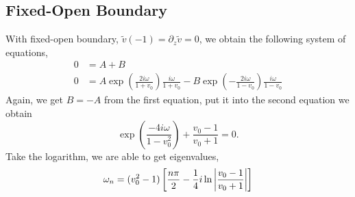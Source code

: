 \subsection*{Fixed-Open Boundary}
With fixed-open boundary, $\tilde{v}(-1)=\partial_z\tilde{v}=0$, we obtain the following system of equations,
\begin{align*}
	0 & = A + B                                                                                                    \\
	0 & = A\exp(\frac{2i\omega}{1+v_0})\frac{i\omega}{1+v_0} - B\exp(-\frac{2i\omega}{1-v_0})\frac{i\omega}{1-v_0}
\end{align*}
Again, we get $B = -A$ from the first equation, put it into the second equation we obtain
\begin{equation}
	\exp(\frac{-4i\omega}{1-v_0^2}) + \frac{v_0-1}{v_0+1} = 0.
\end{equation}
Take the logarithm, we are able to get eigenvalues,
\begin{equation}
	\omega_n = (v_0^2-1)\left[ \frac{n\pi}{2} - \frac{1}{4}i\ln\abs{\frac{v_0-1}{v_0+1}}\right]
\end{equation}

